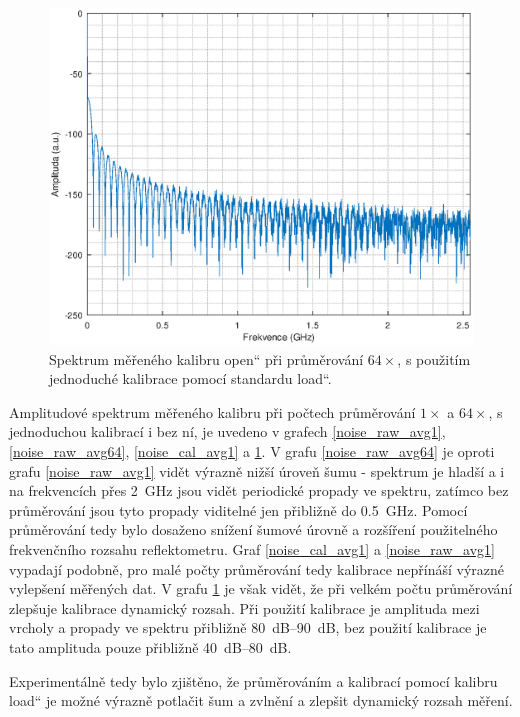 \begin{figure}[htbp]
\includegraphics[width=\textwidth,keepaspectratio]{images/noise_cal_avg64.eps}\caption{Spektrum měřeného kalibru \quotedblbase open\textquotedblleft{} při průměrování $64\times$, s použitím jednoduché kalibrace pomocí standardu \quotedblbase load\textquotedblleft .}\label{noise_cal_avg64}
\end{figure}


Amplitudové spektrum měřeného kalibru při počtech průměrování $1\times$ a $64\times$, s jednoduchou kalibrací i bez ní, je uvedeno v grafech \ref{noise_raw_avg1}, \ref{noise_raw_avg64}, \ref{noise_cal_avg1} a \ref{noise_cal_avg64}. V grafu \ref{noise_raw_avg64} je oproti grafu \ref{noise_raw_avg1} vidět výrazně nižší úroveň šumu - spektrum je hladší a i na frekvencích přes \SI{2}{\giga\hertz} jsou vidět periodické propady ve spektru, zatímco bez průměrování jsou tyto propady viditelné jen přibližně do \SI{0.5}{\giga\hertz}. Pomocí průměrování tedy bylo dosaženo snížení šumové úrovně a rozšíření použitelného frekvenčního rozsahu reflektometru. Graf \ref{noise_cal_avg1} a \ref{noise_raw_avg1} vypadají podobně, pro malé počty průměrování tedy kalibrace nepřínáší výrazné vylepšení měřených dat. V grafu \ref{noise_cal_avg64} je však vidět, že při velkém počtu průměrování zlepšuje kalibrace dynamický rozsah. Při použití kalibrace je amplituda mezi vrcholy a propady ve spektru přibližně \SIrange{80}{90}{\deci\bel}, bez použití kalibrace je tato amplituda pouze přibližně \SIrange{40}{80}{\deci\bel}.

Experimentálně tedy bylo zjištěno, že průměrováním a kalibrací pomocí kalibru \quotedblbase load\textquotedblleft{} je možné výrazně potlačit šum a zvlnění a zlepšit dynamický rozsah měření.

